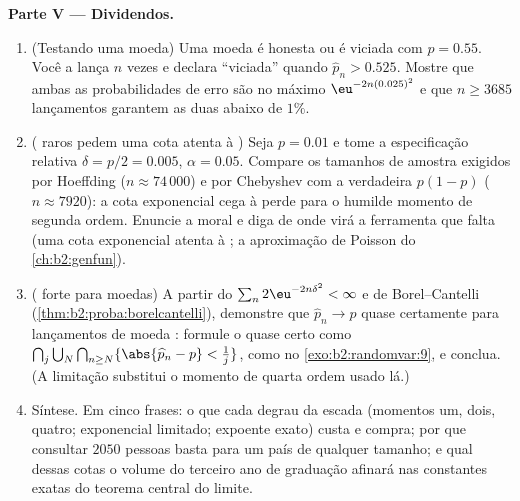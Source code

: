 \begin{problem}
\medskip
\noindent\textbf{Parte V --- Dividendos.}
\begin{enumerate}[resume]
  \item (Testando uma moeda) Uma moeda é honesta ou é viciada com
        $p = 0.55$. Você a lança $n$ vezes e declara
        ``viciada'' quando $\widehat p_n > 0.525$. Mostre que
        ambas as probabilidades de erro são no máximo
        $\eu^{-2n(0.025)^2}$ e que $n \geq 3685$ lançamentos
        garantem as duas abaixo de $1\%$.
  \item ( raros pedem uma cota atenta à ) Seja $p =
        0.01$ e tome a especificação relativa $\delta =
        p/2 = 0.005$, $\alpha = 0.05$. Compare os tamanhos
        de amostra exigidos por Hoeffding ($n \approx 74\,000$) e
        por Chebyshev com a  verdadeira $p(1-p)$ ($n
        \approx 7920$): a cota exponencial cega à 
        perde para o humilde momento de segunda ordem. Enuncie a moral
        e diga de onde virá a ferramenta que falta (uma cota
        exponencial atenta à ; a aproximação de Poisson do
        \cref{ch:b2:genfun}).
  \item ( forte para moedas) A partir do $\sum_n
        2\eu^{-2n\delta^2} < \infty$ e de Borel--Cantelli
        (\cref{thm:b2:proba:borelcantelli}), demonstre que
        $\widehat p_n \to p$ quase certamente para lançamentos de moeda
        : formule o  quase certo como
        $\bigcap_j\bigcup_N\bigcap_{n\geq N}
        \{\abs{\widehat p_n - p} < \tfrac1j\}$, como no
        \cref{exo:b2:randomvar:9}, e conclua. (A limitação
        substitui o momento de quarta ordem usado lá.)
  \item Síntese. Em cinco frases: o que cada degrau da
        escada (momentos um, dois, quatro; exponencial limitado;
        expoente exato) custa e compra; por que consultar $2050$
        pessoas basta para um país de qualquer tamanho; e qual
        dessas cotas o volume do terceiro ano de graduação afinará nas
        constantes exatas do teorema central do limite.
\end{enumerate}
\end{problem}
